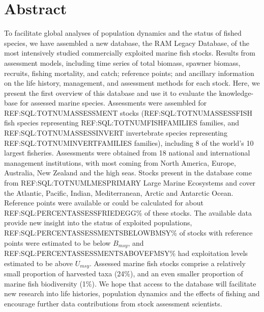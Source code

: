 \section*{Abstract}


To facilitate global analyses of population dynamics and the status of
fished species, we have assembled a new database, the RAM Legacy
Database, of the most intensively studied commercially exploited
marine fish stocks. Results from assessment models, including time
series of total biomass, spawner biomass, recruits, fishing mortality,
and catch; reference points; and ancillary information on the life
history, management, and assessment methods for each stock.  Here, we
present the first overview of this database and use it to evaluate the
knowledge-base for assessed marine species.  Assessments were
assembled for REF:SQL:TOTNUMASSESSMENT stocks
(REF:SQL:TOTNUMASSESSFISH fish species representing
REF:SQL:TOTNUMFISHFAMILIES families, and REF:SQL:TOTNUMASSESSINVERT
invertebrate species representing REF:SQL:TOTNUMINVERTFAMILIES
families), including 8 of the world's 10 largest fisheries.
Assessments were obtained from 18 national and international
management institutions, with most coming from North America, Europe,
Australia, New Zealand and the high seas. Stocks present in the
database come from REF:SQL:TOTNUMLMESPRIMARY Large Marine Ecosystems
and cover the Atlantic, Pacific, Indian, Mediterranean, Arctic and Antarctic
Ocean. Reference points were available or could be calculated for
about REF:SQL:PERCENTASSESSFRIEDEGG\% of these stocks. The available
data provide new insight into the status of exploited populations,
REF:SQL:PERCENTASSESSMENTSBELOWBMSY\% of stocks with reference points
were estimated to be below $B_{msy}$, and
REF:SQL:PERCENTASSESSMENTSABOVEFMSY\% had exploitation levels
estimated to be above $U_{msy}$.  Assessed marine fish stocks comprise
a relatively small proportion of harvested taxa (24\%), and an even
smaller proportion of marine fish biodiversity (1\%). We hope that
access to the database will facilitate new research into life
histories, population dynamics and the effects of fishing and
encourage further data contributions from stock assessment scientists.

